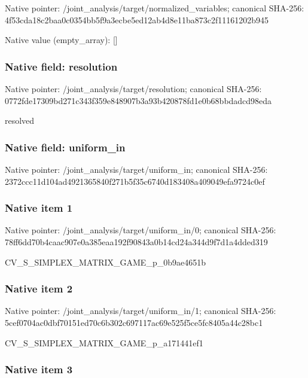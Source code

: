 \documentclass[10pt,a4paper]{article}
\begin{document}
Native pointer: /joint\_analysis/target/n\allowbreak{}ormalized\_variables; canonical SHA-256: 4f53cda18c2baa0c0354bb5f\allowbreak{}9a3ecbe5ed12ab4d8e11ba87\allowbreak{}3c2f11161202b945



Native value (empty\_array): []



\subsubsection{Native field: resolution}


Native pointer: /joint\_analysis/target/resolution; canonical SHA-256: 0772fde17309bd271c343f35\allowbreak{}9e848907b3a93b420878fd1e\allowbreak{}0b68bbdadcd98eda


resolved


\subsubsection{Native field: uniform\_in}


Native pointer: /joint\_analysis/target/uniform\_in; canonical SHA-256: 2372ccc11d104ad492136584\allowbreak{}0f271b5f35c6740d183408a4\allowbreak{}09049efa9724c0ef



\subsubsection{Native item 1}


Native pointer: /joint\_analysis/target/uniform\_in/0; canonical SHA-256: 78ff6dd70b4caac907e0a385\allowbreak{}eaa192f90843a0b14cd24a34\allowbreak{}4d9f7d1a4dded319


CV\_S\_SIMPLEX\_MATRIX\_GAME\_p\_0b9ae4651b


\subsubsection{Native item 2}


Native pointer: /joint\_analysis/target/uniform\_in/1; canonical SHA-256: 5cef0704ac0dbf70151ed70c\allowbreak{}6b302c697117ac69e525f5ce\allowbreak{}5fc8405a44c28bc1


CV\_S\_SIMPLEX\_MATRIX\_GAME\_p\_a171441ef1


\subsubsection{Native item 3}
\end{document}
